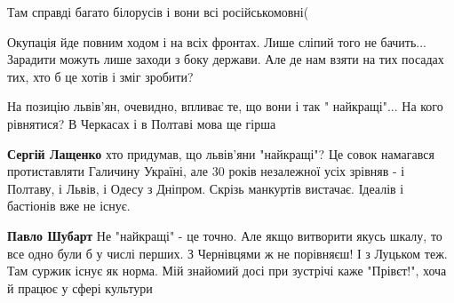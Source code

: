 \begin{itemize}
 
Там справді багато білорусів і вони всі російськомовні(

 

Окупація йде повним ходом і на всіх фронтах. Лише сліпий того не бачить...
Зарадити можуть лише заходи з боку держави. Але де нам взяти на тих посадах
тих, хто б це хотів і зміг зробити?

 

На позицію львів'ян, очевидно, впливає те, що вони і так " найкращі"... На кого
рівнятися? В Черкасах і в Полтаві мова ще гірша

\begin{itemize}
 
\textbf{Сергій Лащенко} хто придумав, що львів'яни "найкращі"? Це совок намагався протиставляти Галичину Україні, але 30 років незалежної усіх зрівняв - і Полтаву, і Львів, і Одесу з Дніпром. Скрізь манкуртів вистачає. Ідеалів і бастіонів вже не існує.

 
\textbf{Павло Шубарт} Не "найкращі" - це точно. Але якщо витворити якусь шкалу, то все одно були б у числі перших. З Чернівцями ж не порівняєш! І з Луцьком теж. Там суржик існує як норма. Мій знайомий досі при зустрічі каже "Прівєт!", хоча й працює у сфері культури


\end{itemize}
\end{itemize}
